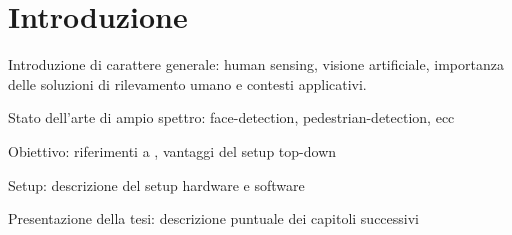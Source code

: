 
\section{Introduzione}
\label{sec:Introduzione}
    Introduzione di carattere generale: human sensing, visione artificiale, importanza delle soluzioni di rilevamento umano e contesti applicativi.

    Stato dell'arte di ampio spettro: face-detection, pedestrian-detection, ecc

    Obiettivo: riferimenti a \cite{Zhu13}, vantaggi del setup top-down

    \cite{Zhu13}

    Setup: descrizione del setup hardware e software

    Presentazione della tesi: descrizione puntuale dei capitoli successivi

